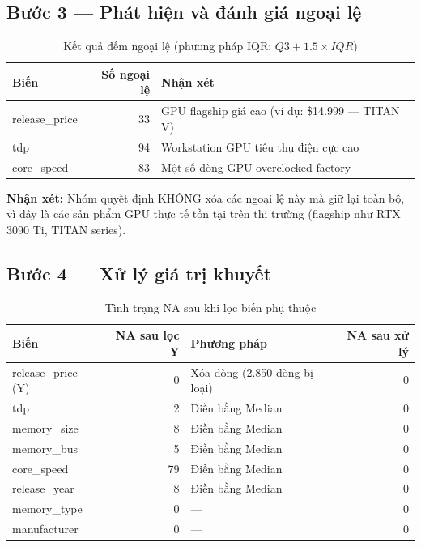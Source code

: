 \documentclass[a4paper]{article}
\begin{document}
\subsection{Bước 3 --- Phát hiện và đánh giá ngoại lệ}

\begin{table}[h!]
\centering
\caption{Kết quả đếm ngoại lệ (phương pháp IQR: $Q3 + 1.5 \times IQR$)}
\begin{tabular}{|l|r|p{7cm}|}
\hline
\textbf{Biến} & \textbf{Số ngoại lệ} & \textbf{Nhận xét} \\
\hline
release\_price & 33 & GPU flagship giá cao (ví dụ: \$14.999 --- TITAN V) \\
tdp & 94 & Workstation GPU tiêu thụ điện cực cao \\
core\_speed & 83 & Một số dòng GPU overclocked factory \\
\hline
\end{tabular}
\end{table}

\textbf{Nhận xét:} Nhóm quyết định KHÔNG xóa các ngoại lệ này mà giữ lại toàn bộ, vì đây là các sản phẩm GPU thực tế tồn tại trên thị trường (flagship như RTX 3090 Ti, TITAN series).

\subsection{Bước 4 --- Xử lý giá trị khuyết}

\begin{table}[h!]
\centering
\caption{Tình trạng NA sau khi lọc biến phụ thuộc}
\begin{tabular}{|l|r|l|r|}
\hline
\textbf{Biến} & \textbf{NA sau lọc Y} & \textbf{Phương pháp} & \textbf{NA sau xử lý} \\
\hline
release\_price (Y) & 0 & Xóa dòng (2.850 dòng bị loại) & 0 \\
tdp & 2 & Điền bằng Median & 0 \\
memory\_size & 8 & Điền bằng Median & 0 \\
memory\_bus & 5 & Điền bằng Median & 0 \\
core\_speed & 79 & Điền bằng Median & 0 \\
release\_year & 8 & Điền bằng Median & 0 \\
memory\_type & 0 & --- & 0 \\
manufacturer & 0 & --- & 0 \\
\hline
\end{tabular}
\end{table}
\end{document}
